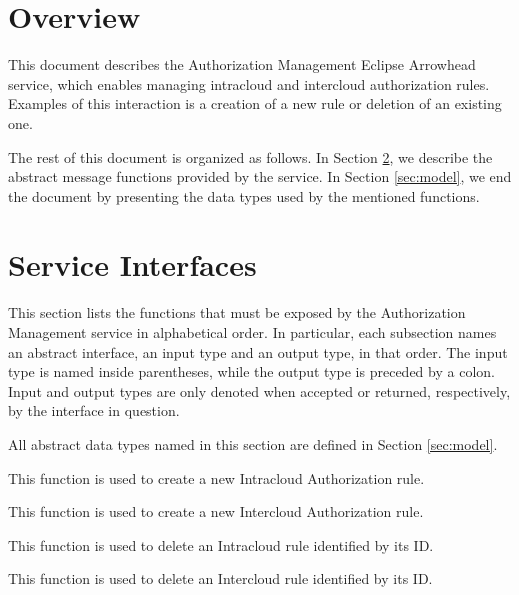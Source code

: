 \documentclass[a4paper]{arrowhead}
\begin{document}
\section{Overview}
\label{sec:overview}

This document describes the Authorization Management Eclipse Arrowhead service, which enables managing intracloud and intercloud authorization rules.
Examples of this interaction is a creation of a new rule or deletion of an existing one.

The rest of this document is organized as follows.
In Section \ref{sec:functions}, we describe the abstract message functions provided by the service.
In Section \ref{sec:model}, we end the document by presenting the data types used by the mentioned functions.

\newpage

\section{Service Interfaces}
\label{sec:functions}

This section lists the functions that must be exposed by the Authorization Management service in alphabetical order.
In particular, each subsection names an abstract interface, an input type and an output type, in that order.
The input type is named inside parentheses, while the output type is preceded by a colon.
Input and output types are only denoted when accepted or returned, respectively, by the interface in question.

All abstract data types named in this section are defined in Section \ref{sec:model}.


This function is used to create a new Intracloud Authorization rule.


This function is used to create a new Intercloud Authorization rule.


This function is used to delete an Intracloud rule identified by its ID.


This function is used to delete an Intercloud rule identified by its ID.
\end{document}
